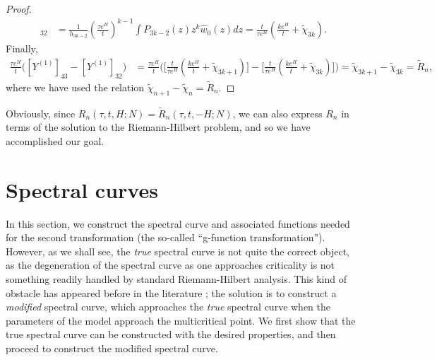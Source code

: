 \documentclass[usenames,dvipsnames]{article}
\theoremstyle{definition}
\numberwithin{equation}{section}
\numberwithin{figure}{section}
\begin{document}
\begin{proof}
        \begin{align*}
            [Y^{(1)}]_{32} &=\frac{1}{h_{3k-2}} \left(\frac{\tau e^H}{t}\right)^{k-1}\int P_{3k-2}(z)z^{k} \hat{w}_0(z)dz=\frac{t}{\tau e^{H}}\left(\frac{k e^H}{t}+\tilde{\chi}_{3k}\right).
        \end{align*}
    Finally, 
        \begin{align*}
            \frac{\tau e^{H}}{t}\bigg([Y^{(1)}]_{43} - [Y^{(1)}]_{32}\bigg) &= \frac{\tau e^{H}}{t}\bigg(\bigg[\frac{t}{\tau e^{H}}\left(\frac{k e^H}{t}+\tilde{\chi}_{3k+1}\right)\bigg] - \bigg[\frac{t}{\tau e^{H}}\left(\frac{k e^H}{t}+\tilde{\chi}_{3k}\right)\bigg]\bigg)=\tilde{\chi}_{3k+1}-\tilde{\chi}_{3k} = \tilde{R}_n,
        \end{align*}
    where we have used the relation $\tilde{\chi}_{n+1}-\tilde{\chi}_{n} = \tilde{R}_n$.
\end{proof}

Obviously, since $R_n(\tau,t,H;N) = \tilde{R}_n(\tau,t,-H;N)$, we can also express $R_n$ in terms of the solution to the Riemann-Hilbert problem, and so we have accomplished our goal.

\section{Spectral curves}\label{section:SpectralCurve}
In this section, we construct the spectral curve and associated functions needed for the second transformation (the so-called ``g-function transformation''). However, as we shall see, the \textit{true} spectral curve is not quite the correct object, as the degeneration of the
spectral curve as one approaches criticality is not something readily handled by standard Riemann-Hilbert analysis. This kind of obstacle has appeared before in the literature \cite{Bleher-Kuijlaars,DKZ,DG}; the solution is to construct a \textit{modified} spectral curve, which approaches the \textit{true} spectral curve when the parameters of the model approach the multicritical point. We first show that
the true spectral curve can be constructed with the desired properties, and then proceed to construct the modified spectral curve.
\end{document}
